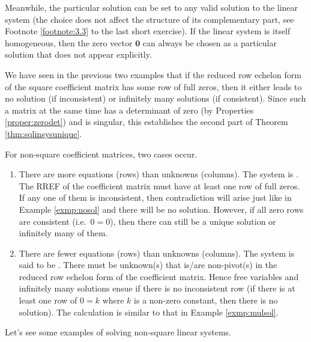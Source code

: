 Meanwhile, the particular solution can be set to any valid solution to the linear system (the choice does not affect the structure of its complementary part, see Footnote \ref{footnote:3.3} to the last short exercise). If the linear system is itself homogeneous, then the zero vector $\textbf{0}$ can always be chosen as a particular solution that does not appear explicitly.\par
We have seen in the previous two examples that if the reduced row echelon form of the square coefficient matrix has some row of full zeros, then it either leads to no solution (if inconsistent) or infinitely many solutions (if consistent). Since such a matrix at the same time has a determinant of zero (by Properties \ref{proper:zerodet}) and is singular, this establishes the second part of Theorem \ref{thm:sqlinsysunique}. \par
For non-square coefficient matrices, two cases occur.
\begin{enumerate}
\item There are more equations (rows) than unknowns (columns). The system is . The RREF of the coefficient matrix must have at least one row of full zeros. If any one of them is inconsistent, then contradiction will arise just like in Example \ref{exmp:nosol} and there will be no solution. However, if all zero rows are consistent (i.e.\ $0=0$), then there can still be a unique solution or infinitely many of them.
\item There are fewer equations (rows) than unknowns (columns). The system is said to be . There must be unknown(s) that is/are non-pivot(s) in the reduced row echelon form of the coefficient matrix. Hence free variables and infinitely many solutions ensue if there is no inconsistent row (if there is at least one row of $0 = k$ where $k$ is a non-zero constant, then there is no solution). The calculation is similar to that in Example \ref{exmp:mulsol}.
\end{enumerate}
Let's see some examples of solving non-square linear systems.
